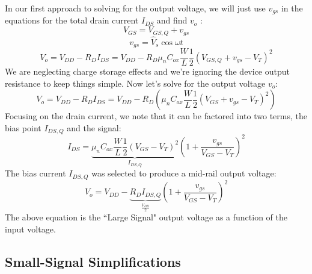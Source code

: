 In our first approach to solving for the output voltage, we will just use $v_{gs}$ in the equations for the total drain current $I_{DS}$  and find $v_o$ :
% 
\begin{equation}
	{V_{GS}} = {V_{GS,Q}} + {v_{gs}}
\end{equation}
%
\begin{equation}
	v_{gs} = {\hat V_s}\cos \omega t
\end{equation}
%
\begin{equation}
	{V_o} = {V_{DD}} - {R_D}{I_{DS}} = {V_{DD}} - {R_D}{\mu _n}{C_{ox}}\frac{W}{L}\frac{1}{2}{({V_{GS,Q}} + {v_{gs}} - {V_T})^2}
\end{equation}
%
We are neglecting charge storage effects and we're ignoring the device output resistance to keep things simple.  Now let's solve for the output voltage $v_o$:
%
\begin{equation}
	{V_o} = {V_{DD}} - {R_D}{I_{DS}} = {V_{DD}} - {R_D}\left( {\mu _n}{C_{ox}}\frac{W}{L}\frac{1}{2}{({V_{GS}} + {v_{gs}} - {V_T})^2} \right)
\end{equation}
%
Focusing on the drain current, we note that it can be factored into two terms, the bias point $I_{DS,Q}$ and the signal:
%
\begin{equation}
I_{DS}  =
\underbrace{{\mu _n}{C_{ox}}\frac{W}{L}\frac{1}{2}{({V_{GS}} - {V_T})^2}}_{I_{DS,Q}}
{\left( {1 + \frac{{{v_{gs}}}}{{{V_{GS}} - {V_T}}}} \right)^2}
\end{equation}
%
The bias current $I_{DS,Q}$ was selected to produce a mid-rail output voltage:
\begin{equation}
	{V_o} = {V_{DD}} - \underbrace{ {R_D}{I_{DS,Q}}}_{\frac{V_{DD}}{2}}{\left( {1 + \frac{{{v_{gs}}}}{{{V_{GS}} - {V_T}}}} \right)^2}
\end{equation}
The above equation is the ``Large Signal" output voltage as a function of the input voltage.



\subsection{Small-Signal Simplifications}

